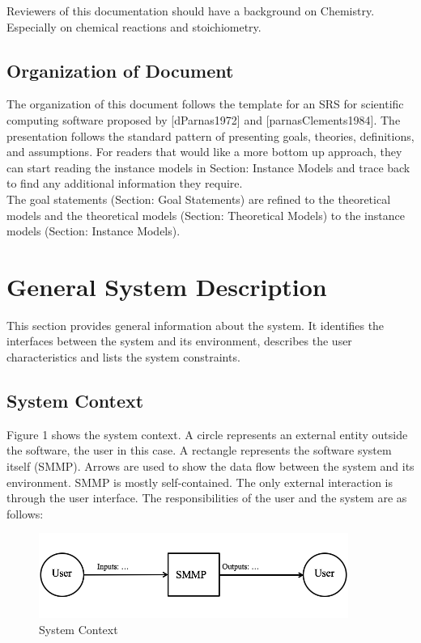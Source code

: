 \documentclass[12pt]{article}
\begin{document}
Reviewers of this documentation should have a background on Chemistry. Especially on chemical reactions and stoichiometry.

\subsection{Organization of Document}

The organization of this document follows the template for an SRS for scientific computing software proposed by [dParnas1972] and [parnasClements1984]. The presentation follows the standard pattern of presenting goals, theories, definitions, and assumptions. For readers that would like a more bottom up approach, they can start reading the instance models in Section: Instance Models and trace back to find any additional information they require. \\
The goal statements (Section: Goal Statements) are refined to the theoretical models and the theoretical models (Section: Theoretical Models) to the instance models (Section: Instance Models). 

\section{General System Description}

This section provides general information about the system.  It identifies the
interfaces between the system and its environment, describes the user
characteristics and lists the system constraints.  

\subsection{System Context}

Figure 1 shows the system context. A circle represents an external entity outside the
software, the user in this case. A rectangle represents the software system itself (SMMP).
Arrows are used to show the data flow between the system and its environment.
SMMP is mostly self-contained. The only external interaction is through the user interface. The responsibilities of the user and the system are as follows:


\begin{figure}[h!]
\begin{center}
 \includegraphics[width=0.9\textwidth]{SystemContextFigure}
\caption{System Context}
\label{Fig_SystemContext} 
\end{center}
\end{figure}
\end{document}
